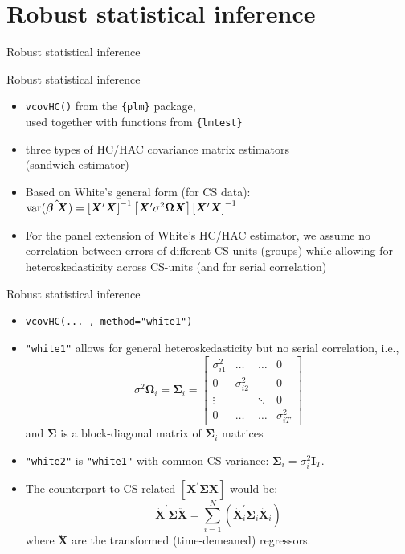\documentclass{beamer}
\begin{document}
\section{Robust statistical inference}
\begin{frame}{Robust statistical inference}
\end{frame}
\begin{frame}{Robust statistical inference}
\begin{itemize}
    \item \texttt{vcovHC()} from the \texttt{\{plm\}} package, 
    \\used together with functions from \texttt{\{lmtest\}}
    \smallskip
    \item three types of HC/HAC covariance matrix estimators \\(sandwich estimator)
    \smallskip
    \item Based on White's general form (for CS data):\\ \medskip 
    $\textnormal{var}(\hat{\bm{\beta}|\bm{X}})= 
    \left[ \bm{X}^{\prime} \bm{X} \right]^{-1}
    \left[ \bm{X}^{\prime} \sigma^2 \bm{\Omega} \bm{X} \right]
    \left[ \bm{X}^{\prime} \bm{X} \right]^{-1}$ \\ \medskip
    \smallskip
    \item For the panel extension of White's HC/HAC estimator, we assume no correlation between errors of different CS-units (groups) while allowing for heteroskedasticity across CS-units (and for serial correlation)
\end{itemize}
\end{frame}
\begin{frame}{Robust statistical inference}
\begin{itemize}
    \item \texttt{vcovHC(... , method="white1")}
    \medskip
    \item \texttt{"white1"} allows for general heteroskedasticity but no serial correlation, i.e.,
    $$
    \sigma^2 \bm{\Omega}_i = \bm{\Sigma}_i =
    \begin{bmatrix}
    \sigma_{i1}^2 & \dots & \dots & 0 \\
    0 & \sigma_{i2}^2 &  & 0 \\
    \vdots & & \ddots & 0 \\
    0 & \dots & \dots & \sigma_{iT}^2
    \end{bmatrix}
    $$
    and $\bm{\Sigma}$ is a block-diagonal matrix of $\bm{\Sigma}_i$ matrices
    \smallskip
    \item \texttt{"white2"} is \texttt{"white1"} with common CS-variance: $\bm{\Sigma}_i = \sigma^2_i \bm{I}_T$.
    \smallskip
    \item The counterpart to CS-related $\left[ \bm{X}^{\prime} \bm{\Sigma} \bm{X} \right]$ would be:
    $$
    \ddot{\bm{X}}^{\prime} \bm{\Sigma} \ddot{\bm{X}} = 
    \sum_{i=1}^N \left( 
    \ddot{\bm{X}}_i^{\prime} \bm{\Sigma}_i \ddot{\bm{X}_i}
    \right)
    $$
    where $\ddot{\bm{X}}$ are the transformed (time-demeaned) regressors.
\end{itemize}
\end{frame}
\end{document}
